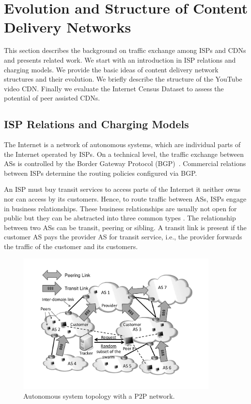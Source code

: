 \section{Evolution and Structure of Content Delivery Networks}\label{sec:aslevel:background}

This section describes the background on traffic exchange among ISPs and CDNs and presents related work.
We start with an introduction in ISP relations and charging models.
We provide the basic ideas of content delivery network structures and their evolution.
We briefly describe the structure of the YouTube video CDN.
Finally we evaluate the Internet Census Dataset to assess the potential of peer assisted CDNs.

\subsection{ISP Relations and Charging Models}

The Internet is a network of autonomous systems, which are individual parts of the Internet operated by ISPs.
On a technical level, the traffic exchange between ASs is controlled by the Border Gateway Protocol (BGP)~\cite{trangia2009}.
Commercial relations between ISPs determine the routing policies configured via BGP.

An ISP must buy transit services to access parts of the Internet it neither owns nor can access by its customers.
Hence, to route traffic between ASs, ISPs engage in business relationships.
These business relationships are usually not open for public but they can be abstracted into three common types \cite{gao2001}.
The relationship between two ASs can be transit, peering or sibling.
A transit link is present if the customer AS pays the provider AS for transit service, i.e., the provider forwards the traffic of the customer and its customers.

\begin{figure}[bt]
\centering
	\includegraphics[width=0.9\textwidth]{aslevel/figs/p2p}
 	\caption{Autonomous system topology with a P2P network.}
 	\label{fig:aslevel:p2p}
\end{figure}

